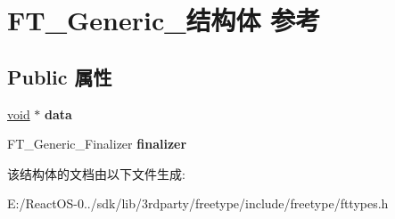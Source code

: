 \hypertarget{struct_f_t___generic__}{}\section{F\+T\+\_\+\+Generic\+\_\+结构体 参考}
\label{struct_f_t___generic__}
\subsection*{Public 属性}
\begin{DoxyCompactItemize}
\item 
\mbox{\label{struct_f_t___generic___af0bf8b983254b662f293e9a20505e27e}} 
\hyperlink{interfacevoid}{void} $\ast$ {\bfseries data}
\item 
\mbox{\label{struct_f_t___generic___a20fce8de90cc9e3876935817247b9ccc}} 
F\+T\+\_\+\+Generic\+\_\+\+Finalizer {\bfseries finalizer}
\end{DoxyCompactItemize}


该结构体的文档由以下文件生成\+:\begin{DoxyCompactItemize}
\item 
E\+:/\+React\+O\+S-\/0../sdk/lib/3rdparty/freetype/include/freetype/fttypes.\+h\end{DoxyCompactItemize}
